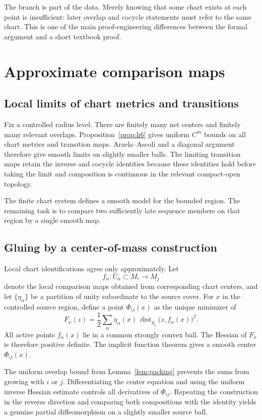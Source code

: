 \documentclass[11pt]{article}
\theoremstyle{plain}
\theoremstyle{definition}
\theoremstyle{remark}
\newcommand{\dist}{\operatorname{dist}}
\begin{document}
The branch is part of the data.  Merely knowing that some chart exists at
each point is insufficient: later overlap and cocycle statements must refer
to the same chart.  This is one of the main proof-engineering differences
between the formal argument and a short textbook proof.

\section{Approximate comparison maps}

\subsection{Local limits of chart metrics and transitions}

Fix a controlled radius level.  There are finitely many net centers and
finitely many relevant overlaps.  Proposition~\ref{prop:h6} gives uniform
\(C^m\) bounds on all chart metrics and transition maps.  Arzela--Ascoli and
a diagonal argument therefore give smooth limits on slightly smaller balls.
The limiting transition maps retain the inverse and cocycle identities
because these identities hold before taking the limit and composition is
continuous in the relevant compact-open topology.

The finite chart system defines a smooth model for the bounded region.  The
remaining task is to compare two sufficiently late sequence members on that
region by a single smooth map.

\subsection{Gluing by a center-of-mass construction}

Local chart identifications agree only approximately.  Let
\[
  f_\alpha:U_\alpha\subset M_i\longrightarrow M_j
\]
denote the local comparison maps obtained from corresponding chart centers,
and let \(\{\eta_\alpha\}\) be a partition of unity subordinate to the source
cover.  For \(x\) in the controlled source region, define a point
\(\Phi_{ij}(x)\) as the unique minimizer of
\[
  F_x(z)
  =
  \frac12\sum_\alpha
  \eta_\alpha(x)\,
  \dist_{g_j}\bigl(z,f_\alpha(x)\bigr)^2.
\]
All active points \(f_\alpha(x)\) lie in a common strongly convex ball.  The
Hessian of \(F_x\) is therefore positive definite.  The implicit function
theorem gives a smooth center \(\Phi_{ij}(x)\).

The uniform overlap bound from Lemma~\ref{lem:packing} prevents the sums from
growing with \(i\) or \(j\).  Differentiating the center equation and using
the uniform inverse Hessian estimate controls all derivatives of
\(\Phi_{ij}\).  Repeating the construction in the reverse direction and
comparing both compositions with the identity yields a genuine partial
diffeomorphism on a slightly smaller source ball.
\end{document}
